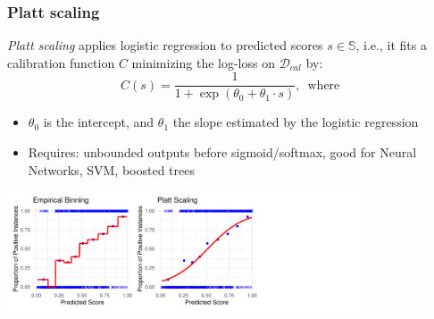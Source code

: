 \documentclass[11pt,compress,t,notes=noshow, xcolor=table]{beamer}
\begin{document}
\begin{frame}[t]
	\frametitle{Platt scaling
 }

	
\emph{Platt scaling} applies logistic regression to predicted scores $s \in \mathbb{S}$, i.e., it fits a calibration function $C$ minimizing the log-loss on $\mathcal{D}_{cal}$ by:
		$$
		C(s) = \frac{1}{1 + \exp( \theta_0 + \theta_1 \cdot s) } , \, \text{ where }
		$$

  \begin{itemize}
    \item $\theta_0$ is the intercept, and $\theta_1$ the slope estimated by the logistic regression
    \item Requires: unbounded outputs before sigmoid/softmax, good for Neural Networks, SVM, boosted trees
\end{itemize}
  \vfill\centering
\includegraphics[width=0.8\textwidth]{figure/calibration_methods2.pdf}
\end{frame}
\end{document}
